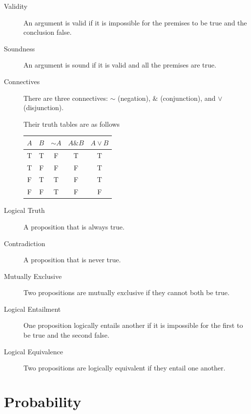 \documentclass[justified]{tufte-book}
\renewcommand{\neg}{\mathbin{\sim}}
\renewcommand{\wedge}{\mathbin{\&}}
\theoremstyle{definition}
\theoremstyle{definition}
\theoremstyle{definition}
\theoremstyle{remark}
\begin{document}
\begin{description}
\item[Validity]
An argument is valid if it is impossible for the premises to be true and
the conclusion false.
\item[Soundness]
An argument is sound if it is valid and all the premises are true.
\item[Connectives]
There are three connectives: \(\neg\) (negation), \(\wedge\)
(conjunction), and \(\vee\) (disjunction).

Their truth tables are as follows

\begin{longtable}[]{@{}ccccc@{}}
\toprule
\(A\) & \(B\) & \(\neg A\) & \(A \wedge B\) &
\(A \vee B\)\tabularnewline
\midrule
\endhead
T & T & F & T & T\tabularnewline
T & F & F & F & T\tabularnewline
F & T & T & F & T\tabularnewline
F & F & T & F & F\tabularnewline
\bottomrule
\end{longtable}
\item[Logical Truth]
A proposition that is always true.
\item[Contradiction]
A proposition that is never true.
\item[Mutually Exclusive]
Two propositions are mutually exclusive if they cannot both be true.
\item[Logical Entailment]
One proposition logically entails another if it is impossible for the
first to be true and the second false.
\item[Logical Equivalence]
Two propositions are logically equivalent if they entail one another.
\end{description}

\hypertarget{probability}{%
\section*{Probability}\label{probability}}
\end{document}
